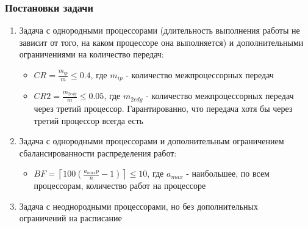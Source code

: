 \begin{frame}
    \frametitle{Постановки задачи}
    \begin{enumerate}
        \item Задача с однородными процессорами (длительность выполнения работы не зависит от того, на каком процессоре она выполняется) и дополнительными ограничениями на количество передач:
              \begin{itemize}
                  \item $CR = \frac{m_{ip}}{m} \leq 0.4$, где $m_{ip}$ - количество межпроцессорных передач
                        \vspace{5pt}
                  \item $CR2 = \frac{m_{2edg}}{m} \leq 0.05$, где $m_{2edg}$ - количество межпроцессорных передач через третий процессор. Гарантированно, что передача хотя бы через третий процессор всегда есть
              \end{itemize}
        \item Задача с однородными процессорами и дополнительным ограничением сбалансированности распределения работ:
              \begin{itemize}
                  \item $BF = \left\lceil 100 \left( \frac{a_{max} p}{n} - 1 \right) \right\rceil \leq 10$, где $a_{max}$ - наибольшее, по всем процессорам, количество работ на процессоре
              \end{itemize}
        \item Задача с неоднородными процессорами, но без дополнительных \\ограничений на расписание
    \end{enumerate}
\end{frame}
